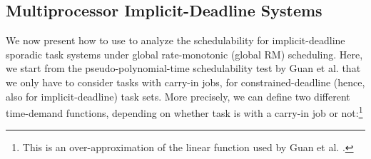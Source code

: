 \documentclass[10pt,conference]{IEEEtran}
\newcommand{\frameworkkq}[1]{}
\def\myendproof{{\ \vbox{\hrule\hbox{\vrule height1.3ex\hskip0.8ex\vrule}\hrule }}\par}
\renewenvironment{proof}{\noindent{\bf Proof. }}{\myendproof}
\newtheorem{corollary}{Corollary}
\begin{document}
\begin{comment}
Bini \cite{DBLP:journals/tc/Bini15} provides a total utilization bound
of RM scheduling, based on the quadratic response time analysis in
\cite{bini2009response}, that works for any arbitrary ratio of
. However, the analysis in
\cite{DBLP:conf/rtss/Lehoczky90,DBLP:journals/tc/Bini15} considers the
whole task set to define  in the schedulability analysis. In
fact, for testing the schedulability of task , we only have to
consider , which is defined as  in
the following corollary.

\begin{corollary}
  \label{corollary:arbitrary-utilization-schedulability}
  Task  in a sporadic task system with  is schedulable by rate-monotonic scheduling
  algorithm in uniprocessor systems if 
{\small  
}
or 
{\small
 
 }
\end{corollary}
\begin{proof}
  Under RM scheduling, we know that . The resulting schedulability condition in
  Corollary~\ref{corollary:arbitrary-response-schedulability} is
  identical to
  Lemma~\ref{lemma:framework-constrained-schedulability}. Therefore,
  we can directly apply Lemmas~\ref{lemma:framework-totalU-exclusive}
  and \ref{lemma:framework-totalU-constrained-beta} to derive the two
  utilization bounds in Eq.~\eqref{eq:arbitrary-RM-utilization-exclusive}
  and~\eqref{eq:arbitrary-RM-totalU-constrained-beta}, respectively.
\end{proof}
\end{comment}






\subsection{Multiprocessor Implicit-Deadline Systems}  

We now present how to use \frameworkkq{} to analyze the schedulability
for implicit-deadline sporadic task systems under global
rate-monotonic (global RM) scheduling. Here, we start from the
pseudo-polynomial-time schedulability test by Guan et
al. \cite{DBLP:conf/rtss/GuanSYY09} that we only have to consider
 tasks with carry-in jobs, for constrained-deadline (hence, also
for implicit-deadline) task sets.  More precisely, we can define two
different time-demand functions, depending on whether task  is
with a carry-in job or not:\footnote{This is an over-approximation of
  the linear function used by Guan et
  al. \cite{DBLP:conf/rtss/GuanSYY09}.}
\end{document}
